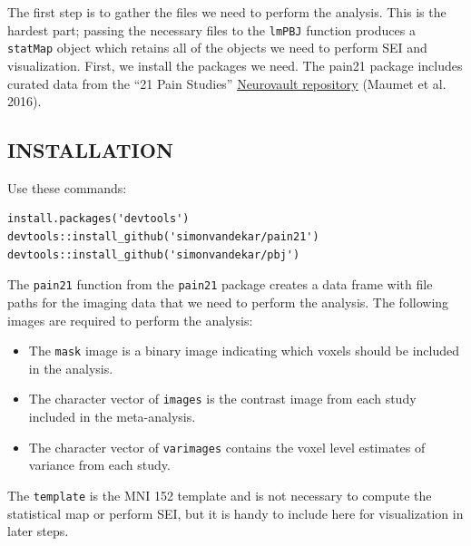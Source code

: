 \documentclass[]{article}
\providecommand{\tightlist}{%
  \setlength{\itemsep}{0pt}\setlength{\parskip}{0pt}}
\begin{document}
The first step is to gather the files we need to perform the analysis.
This is the hardest part; passing the necessary files to the
\texttt{lmPBJ} function produces a \texttt{statMap} object which retains
all of the objects we need to perform SEI and visualization. First, we
install the packages we need. The pain21 package includes curated data
from the ``21 Pain Studies''
\href{https://neurovault.org/collections/1425/}{Neurovault repository}
(Maumet et al. 2016).

\hypertarget{installation}{%
\subsection{INSTALLATION}\label{installation}}

Use these commands:

\begin{verbatim}
install.packages('devtools')
devtools::install_github('simonvandekar/pain21')
devtools::install_github('simonvandekar/pbj')
\end{verbatim}

The \texttt{pain21} function from the \texttt{pain21} package creates a
data frame with file paths for the imaging data that we need to perform
the analysis. The following images are required to perform the analysis:

\begin{itemize}
\tightlist
\item
  The \texttt{mask} image is a binary image indicating which voxels
  should be included in the analysis.
\item
  The character vector of \texttt{images} is the contrast image from
  each study included in the meta-analysis.
\item
  The character vector of \texttt{varimages} contains the voxel level
  estimates of variance from each study.
\end{itemize}

The \texttt{template} is the MNI 152 template and is not necessary to
compute the statistical map or perform SEI, but it is handy to include
here for visualization in later steps.
\end{document}

